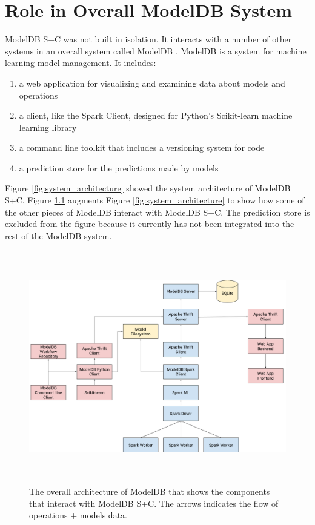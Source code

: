 \chapter{Role in Overall ModelDB System}
ModelDB S+C was not built in isolation. It interacts with a number of other
systems in an overall system called ModelDB \cite{hilda}. ModelDB is a system for machine learning
model management. It includes:

\begin{enumerate}
\item a web application for visualizing and examining data about models and operations
\item a client, like the Spark Client, designed for Python's Scikit-learn machine learning
library
\item a command line toolkit that includes a versioning system for code
\item a prediction store for the predictions made by models
\end{enumerate}

Figure \ref{fig:system_architecture} showed the system architecture
of ModelDB S+C. Figure \ref{fig:full_system_architecture} augments Figure \ref{fig:system_architecture}
to show how some of the other pieces of ModelDB interact with ModelDB S+C. The prediction store
is excluded from the figure because it currently has not been integrated into the rest of the ModelDB
system.

\begin{figure}
  \centering
  \includegraphics[height=4.0in]{full_system_architecture}
  \caption{
    The overall architecture of ModelDB that shows the components
    that interact with ModelDB S+C. The arrows indicates the flow
    of operations + models data. 
  }
  \label{fig:full_system_architecture}
\end{figure}


